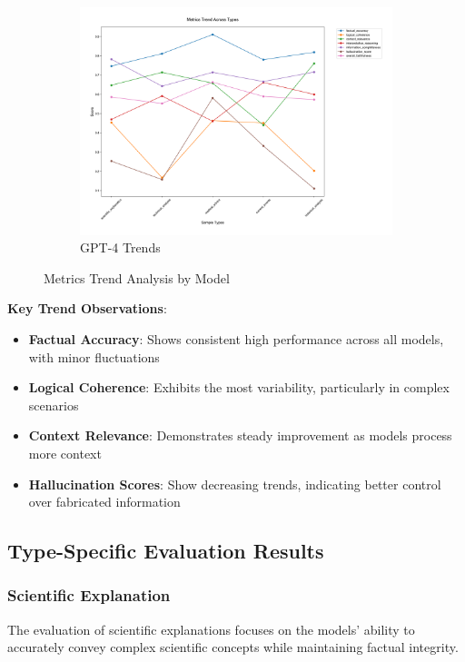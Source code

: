 \begin{figure}[!htbp]
\begin{subfigure}{0.3\textwidth}
    \includegraphics[width=\textwidth]{figures/overall/metrics_trend_gpt-4.png}
    \caption{GPT-4 Trends}
    \label{fig:metrics_trend_gpt4}
\end{subfigure}
\caption{Metrics Trend Analysis by Model}
\label{fig:metrics_trends}
\end{figure}

\textbf{Key Trend Observations}:
\begin{itemize}
    \item \textbf{Factual Accuracy}: Shows consistent high performance across all models, with minor fluctuations
    \item \textbf{Logical Coherence}: Exhibits the most variability, particularly in complex scenarios
    \item \textbf{Context Relevance}: Demonstrates steady improvement as models process more context
    \item \textbf{Hallucination Scores}: Show decreasing trends, indicating better control over fabricated information
\end{itemize}

\subsection{Type-Specific Evaluation Results}

\subsubsection{Scientific Explanation}
The evaluation of scientific explanations focuses on the models' ability to accurately convey complex scientific concepts while maintaining factual integrity.

